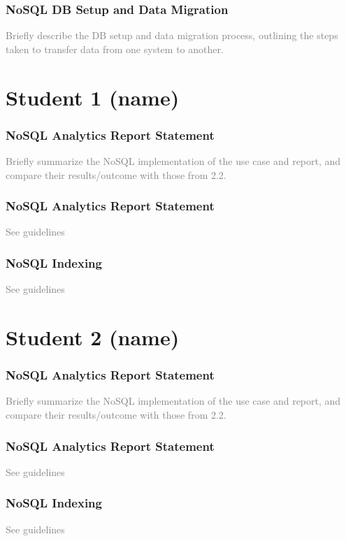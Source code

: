 \documentclass[a4paper, 11pt]{article}          %
\begin{document}
\subsubsection{NoSQL DB Setup and Data Migration}
\textcolor{gray}{
Briefly describe the DB setup and data migration process, outlining the steps taken to transfer data from one system to another.
}

\section*{Student 1 (name)}
\subsubsection{NoSQL Analytics Report Statement}
\textcolor{gray}{
Briefly summarize the NoSQL implementation of the use case and report, and compare their results/outcome with those from 2.2.
}
\subsubsection{NoSQL Analytics Report Statement}
\textcolor{gray}{
See guidelines
}

\subsubsection{NoSQL Indexing}
\textcolor{gray}{
See guidelines
}

\setcounter{subsubsection}{2}

\section*{Student 2 (name)}
\subsubsection{NoSQL Analytics Report Statement}
\textcolor{gray}{
Briefly summarize the NoSQL implementation of the use case and report, and compare their results/outcome with those from 2.2.
}
\subsubsection{NoSQL Analytics Report Statement}
\textcolor{gray}{
See guidelines
}

\subsubsection{NoSQL Indexing}
\textcolor{gray}{
See guidelines
}
\end{document}
